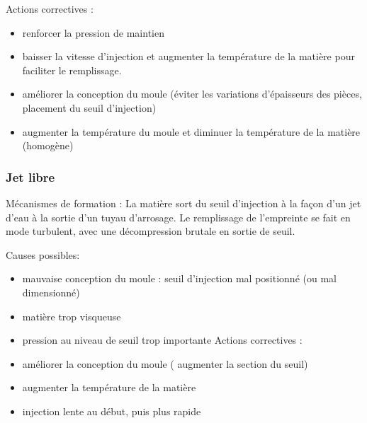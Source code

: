 \documentclass[11pt,oneside]{article}
\begin{document}
        Actions correctives : 
\begin{itemize}
 \item  renforcer la pression de maintien 
 \item  baisser  la  vitesse  d’injection et augmenter la température  de 
la matière  pour  faciliter  le remplissage. 
 \item  améliorer  la  conception  du  moule  (éviter  les  variations 
d’épaisseurs  des  pièces, placement du seuil d’injection) 
 \item  augmenter la température du moule et diminuer la température de la
matière (homogène) 
        
\end{itemize}
 
  
\subsubsection{Jet libre}
       Mécanismes de formation : 
       La  matière  sort  du  seuil  d’injection  à  la  façon  d’un  jet  d’eau
 à  la  sortie  d’un  tuyau d’arrosage.  Le  remplissage  de  l’empreinte  se 
fait  en  mode  turbulent, avec  une 
décompression brutale en sortie de seuil. 
        
       Causes possibles: 
\begin{itemize}
 \item mauvaise  conception  du  moule :  seuil  d’injection  mal  positionné 
(ou  mal dimensionné) 
 \item matière trop visqueuse 
 \item pression au niveau de seuil trop importante 
       Actions correctives : 
 \item améliorer la conception du moule ( augmenter la section du seuil) 
 \item augmenter la température de la matière 
 \item injection lente au début, puis plus rapide 
\end{itemize}
 
\end{document}

